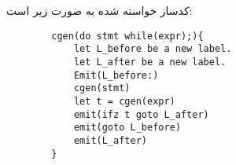 کدساز خواسته شده به صورت زیر است:
\begin{latin}
	\begin{verbatim}
		cgen(do stmt while(expr);){
			let L_before be a new label.
			let L_after be a new label.
			Emit(L_before:)
			cgen(stmt)
			let t = cgen(expr)
			emit(ifz t goto L_after)
			emit(goto L_before)
			emit(L_after)
		}
	\end{verbatim}
\end{latin}